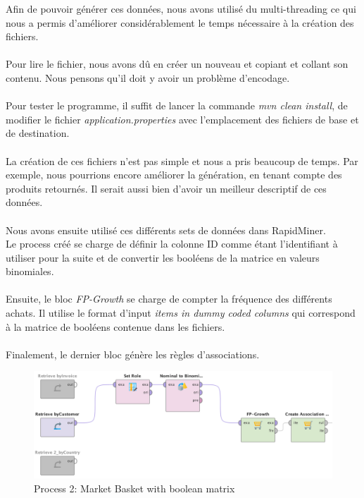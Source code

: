 \documentclass[a4paper]{article}
\begin{document}
Afin de pouvoir générer ces données, nous avons utilisé du multi-threading ce qui nous a permis d'améliorer considérablement le temps nécessaire à la création des fichiers.
\\\\
Pour lire le fichier, nous avons dû en créer un nouveau et copiant et collant son contenu. Nous pensons qu'il doit y avoir un problème d'encodage. 
\\\\
Pour tester le programme, il suffit de lancer la commande \textit{mvn clean install}, de modifier le fichier \textit{application.properties} avec l'emplacement des fichiers de base et de destination.
\\\\
La création de ces fichiers n'est pas simple et nous a pris beaucoup de temps. Par exemple, nous pourrions encore améliorer la génération, en tenant compte des produits retournés.
Il serait aussi bien d'avoir un meilleur descriptif de ces données.
\\\\
Nous avons ensuite utilisé ces différents sets de données dans RapidMiner.
\\
Le process créé se charge de définir la colonne ID comme étant l'identifiant à utiliser pour la suite et de convertir les booléens de la matrice en valeurs binomiales.
\\\\
Ensuite, le bloc \textit{FP-Growth} se charge de compter la fréquence des différents achats. Il utilise le format d'input \textit{items in dummy coded columns} qui correspond à la matrice de booléens contenue dans les fichiers.
\\\\
Finalement, le dernier bloc génère les règles d'associations.

\begin{figure}[H]
	\includegraphics[width=\linewidth]{imgs/part_2/2_full_process_1}
	\caption{Process 2: Market Basket with boolean matrix}
	\label{fig:2_full_process_1}
\end{figure}
\end{document}
